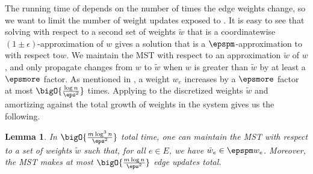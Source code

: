 \documentclass[11pt]{article}
\numberwithin{equation}{section}
\newtheorem{lemma}[theorem]{Lemma}
\theoremstyle{definition}
\theoremstyle{plain}
\newcommand{\weight}[1]{w_{#1}}
\newcommand{\weightv}{w}%
\newcommand{\apxweight}{\tilde{w}}%
\newcommand{\apxweightof}[1]{\apxweight_{#1}}%
\newcommand{\wrt}{with respect to\xspace} %
\begin{document}
The running time of  depends on the number of
times the edge weights change, so we want to limit the number of
weight updates exposed to . It is easy to see
that solving  \wrt a second set of weights
$\apxweight$ that is a
%
%
coordinatewise
%
$(1 \pm \epsilon)$-approximation %
%
of $\weightv$ gives a solution that is a
%
$\epspm$-approximation  %
to 
\wrt $\weightv$. We maintain the MST \wrt an approximation
$\apxweight$ of $\weightv$, and only propagate changes from $\weightv$
to $\apxweight$ when $\weightv$ is greater than $\apxweight$ by at
least a %
 $\epsmore$ factor.  %
As mentioned in
, a weight $\weight{e}$ increases by a
%
$\epsmore$ factor  %
at most
$\bigO{\frac{\log n}{\eps^2}}$ times. Applying 
to the discretized weights $\apxweight$ and amortizing against the
total growth of weights in the system gives us the following.
\begin{lemma}
  In $\bigO{\frac{m \log^3 n}{\eps^2}}$ total time, one can maintain
  the MST \wrt a set of weights $\apxweight$ such that, for all
  $e \in E$, we have $\apxweightof{e} \in \epspm \weight{e}$. Moreover,
  the MST makes at most $\bigO{\frac{m \log n}{\eps^2}}$ edge updates
  total.
\end{lemma}
\end{document}

